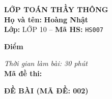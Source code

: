 \noindent
\begin{tcolorbox}[colback=white,colframe=black,arc=0mm,boxrule=0.8pt,top=4pt,bottom=4pt,left=6pt,right=6pt]
	\begin{minipage}[c]{0.44\textwidth}
		{\bfseries\large LỚP TOÁN THẦY THÔNG}\\[3pt]
		\textbf{Họ và tên:} \textbf{\large Hoàng Nhật}\\[3pt]
		\textbf{Lớp:} LỚP 10 \quad -- \quad \textbf{Mã HS:} \texttt{HS007}
	\end{minipage}
	\hfill
	\begin{minipage}[c]{0.22\textwidth}
		\begin{tcolorbox}[colback=white,colframe=black,arc=0mm,boxrule=0.6pt,height=1.8cm,halign=center,valign=top,top=2pt]
			{\bfseries\normalsize Điểm}
		\end{tcolorbox}
	\end{minipage}
	\hfill
	\begin{minipage}[c]{0.30\textwidth}
		\raggedleft
		\textit{Thời gian làm bài: 30 phút}\\[4pt]
		\textbf{Mã đề thi:} 
	\end{minipage}
\end{tcolorbox}
\vspace{0.25cm}

\noindent\textbf{\large ĐỀ BÀI (MÃ ĐỀ: 002)}
\vspace{0.1cm}


